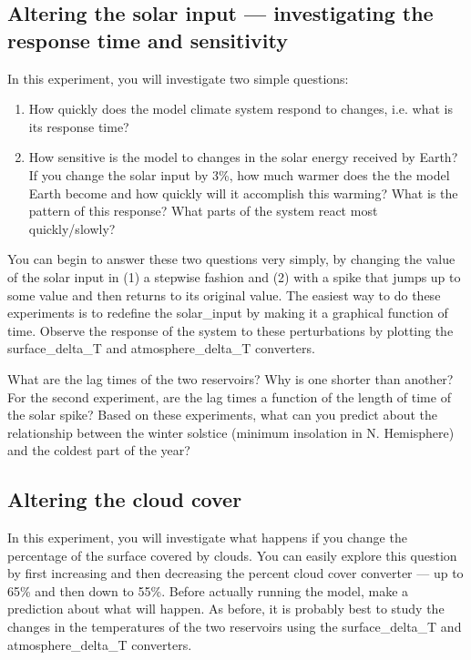\documentclass[11pt,letterpaper]{article}
\begin{document}
\subsection{Altering the solar input --- investigating the response time and sensitivity}
In this experiment, you will investigate two simple questions: 
\begin{enumerate}
\item How quickly does the model climate system respond to changes, i.e. what is its
response time?
\item How sensitive is the model to changes in the solar energy received by Earth? If you change the solar input by 3\%, how much warmer does the the model Earth become and how quickly will it accomplish this warming? What is the pattern of this response? What parts of the system react most quickly/slowly?
\end{enumerate}

You can begin to answer these two questions very simply, by changing the value of the solar input in (1) a stepwise fashion and (2) with a spike that jumps up to some value and then returns to its original value. The easiest way to do these experiments is to redefine the solar\_input by making it a graphical function of time. Observe the response of the system to these perturbations by plotting the surface\_delta\_T and atmosphere\_delta\_T converters.

What are the lag times of the two reservoirs? Why is one shorter than another? For the second experiment, are the lag times a function of the length of time of the solar spike? Based on these experiments, what can you predict about the relationship between the winter solstice (minimum insolation in N. Hemisphere) and the coldest part of the year?

\subsection{Altering the cloud cover}
In this experiment, you will investigate what happens if you change the percentage of the surface covered by clouds. You can easily explore this question by first increasing and then decreasing the percent cloud cover converter --- up to 65\% and then down to 55\%. Before actually
running the model, make a prediction about what will happen. As before, it is probably best to study the changes in the temperatures of the two reservoirs using the surface\_delta\_T and atmosphere\_delta\_T converters. 
\end{document}
